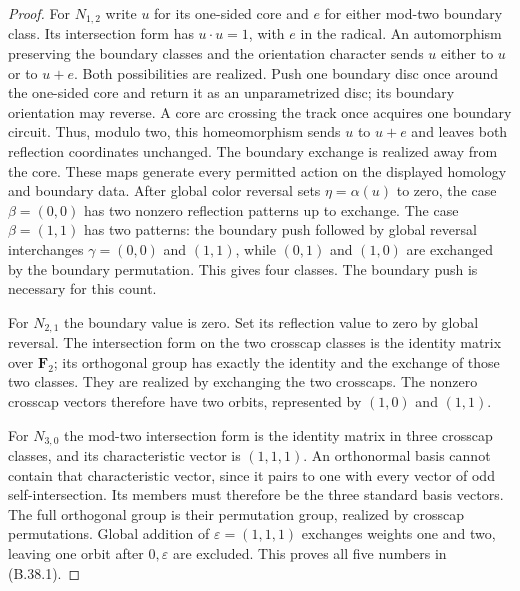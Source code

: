 \begin{proof}
For $N_{1,2}$ write $u$ for its one-sided core and $e$ for
either mod-two boundary class.  Its intersection form has
$u\cdot u=1$, with $e$ in the radical.
An automorphism preserving the boundary classes and the
orientation character sends $u$ either to $u$ or to $u+e$.
Both possibilities are realized.  Push one boundary disc once
around the one-sided core and return it as an unparametrized
disc; its boundary orientation may reverse.  A core arc crossing
the track once acquires one boundary circuit.  Thus, modulo two,
this homeomorphism sends $u$ to $u+e$ and leaves both reflection
coordinates unchanged.  The boundary exchange is realized away
from the core.  These maps generate every permitted action on
the displayed homology and boundary data.
After global color reversal sets $\eta=\alpha(u)$ to zero,
the case $\beta=(0,0)$ has two nonzero reflection patterns up
to exchange.  The case $\beta=(1,1)$ has two patterns: the
boundary push followed by global reversal interchanges
$\gamma=(0,0)$ and $(1,1)$, while $(0,1)$ and $(1,0)$ are
exchanged by the boundary permutation.  This gives four classes.
The boundary push is necessary for this count.

For $N_{2,1}$ the boundary value is zero.
Set its reflection value to zero by global reversal.
The intersection form on the two crosscap classes is the
identity matrix over $\mathbf F_2$; its orthogonal group has
exactly the identity and the exchange of those two classes.
They are realized by exchanging the two crosscaps.
The nonzero crosscap vectors therefore have two orbits,
represented by $(1,0)$ and $(1,1)$.

For $N_{3,0}$ the mod-two intersection form is the identity
matrix in three crosscap classes, and its characteristic
vector is $(1,1,1)$.  An orthonormal basis cannot contain that
characteristic vector, since it pairs to one with every vector
of odd self-intersection.  Its members must therefore be the
three standard basis vectors.  The full orthogonal group is
their permutation group, realized by crosscap permutations.
Global addition of $\varepsilon=(1,1,1)$ exchanges weights
one and two, leaving one orbit after $0,\varepsilon$ are
excluded.  This proves all five numbers in (B.38.1).


\end{proof}
